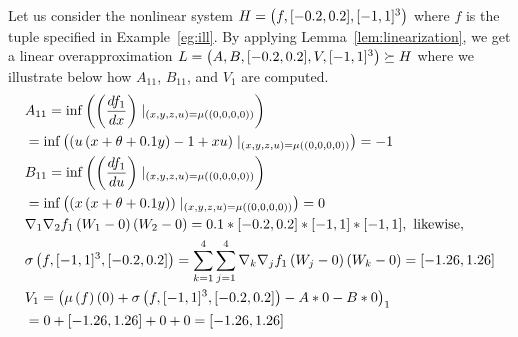 \begin{example}
Let us consider the nonlinear system $H = \left(f,[-0.2,0.2],[-1,1]^3\right)$
where $f$ is the tuple specified in Example~\ref{eg:ill}.  By applying
Lemma~\ref{lem:linearization}, we get a linear overapproximation $L
= \left(A,B,[-0.2,0.2],V,[-1,1]^3\right)\succeq H$ where we illustrate below
how $A_{11}$, $B_{11}$, and $V_{1}$ are computed.
%
\begin{align*}
& A_{11} = \inf\rb{\rb{\frac{df_1}{dx}}\mid_{\rb{x,y,z,u} =
\ivmat{(0,0,0,0)}}} \\ & = \inf\rb{\rb{u\rb{ x + \theta + 0.1y } - 1 +
xu}\mid_{\rb{x,y,z,u} = \ivmat{(0,0,0,0)}}} = -1 \\
%
& B_{11} = \inf\rb{\rb{\frac{df_1}{du}}\mid_{\rb{x,y,z,u} =
\ivmat{(0,0,0,0)}}} \\ &= \inf\rb{\rb{x\rb{ x + \theta + 0.1y
}}\mid_{\rb{x,y,z,u} = \ivmat{(0,0,0,0)}}} = 0 \\
%
& \nabla_1\nabla_2f_1\rb{W_1-0}\rb{W_2-0} =
0.1*[-0.2,0.2]*[-1,1]*[-1,1],~\text{likewise},\\
& \taylor{f}{[-1,1]^3}{[-0.2,0.2]}
= \sum_{k=1}^4\sum_{j=1}^4\nabla_k\nabla_jf_1\rb{W_j-0}\rb{W_k-0}
= [-1.26, 1.26]\\
%
& V_1 = \rb{\iv{f}{ 0 }
+ \taylor{f}{[-1,1]^3}{[-0.2,0.2]}
- A*0 - B*0}_1 \\
& = 0 + [-1.26,1.26] + 0 + 0 = [-1.26, 1.26]
\end{align*}
%
\end{example}
%
